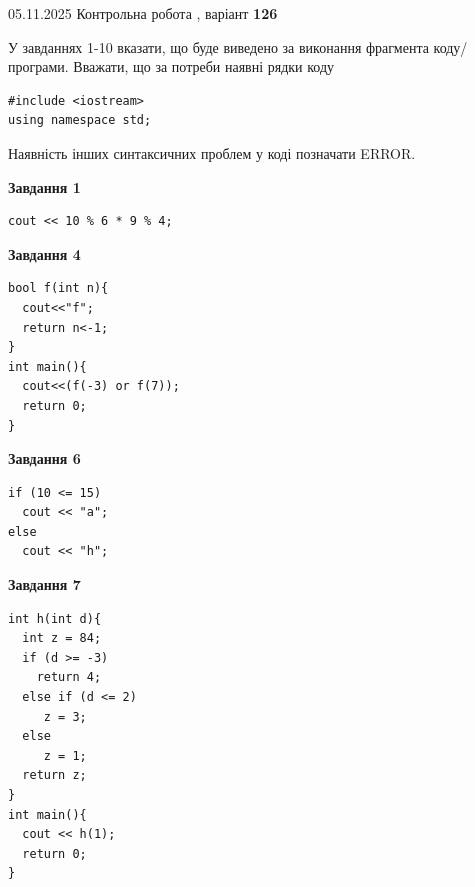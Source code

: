 \documentclass[12pt, ukrainian]{article}
\begin{document}
{\Large{05.11.2025 Контрольна робота , варіант  \No \textbf { 126 }\par}}
{
\begin {large}
У завданнях 1-10 вказати, що буде виведено за виконання фрагмента коду/про\-гра\-ми.
Вважати, що за потреби наявні рядки коду
\begin{verbatim}
#include <iostream>
using namespace std;
\end{verbatim}
Наявність інших синтаксичних проблем у коді позначати ERROR.

\begin{minipage}[t]{7.0cm}

\begin{center}
\textbf{Завдання 1}
\end{center}
\vspace{-8mm}

\begin{verbatim}
cout << 10 % 6 * 9 % 4;
\end{verbatim}



\begin{center}
\textbf{Завдання 4}
\end{center}
\vspace{-8mm}

\begin{verbatim}
bool f(int n){
  cout<<"f";
  return n<-1;
}
int main(){
  cout<<(f(-3) or f(7));
  return 0;
}
\end{verbatim}



\begin{center}
\textbf{Завдання 6}
\end{center}
\vspace{-8mm}

\begin{verbatim}
if (10 <= 15)
  cout << "a";
else
  cout << "h";
\end{verbatim}



\begin{center}
\textbf{Завдання 7}
\end{center}
\vspace{-8mm}

\begin{verbatim}
int h(int d){
  int z = 84;
  if (d >= -3)
    return 4;
  else if (d <= 2)
     z = 3;
  else
     z = 1;
  return z;
}
int main(){
  cout << h(1);
  return 0;
}
\end{verbatim}


\end{minipage}
\end{large}}
\end{document}
